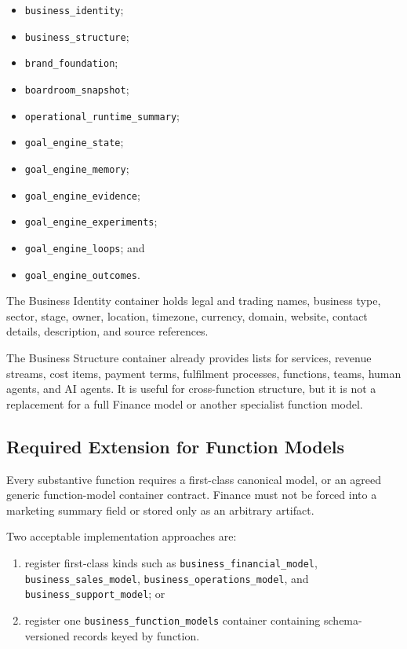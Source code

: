 \begin{itemize}
  \item \texttt{business\_identity};
  \item \texttt{business\_structure};
  \item \texttt{brand\_foundation};
  \item \texttt{boardroom\_snapshot};
  \item \texttt{operational\_runtime\_summary};
  \item \texttt{goal\_engine\_state};
  \item \texttt{goal\_engine\_memory};
  \item \texttt{goal\_engine\_evidence};
  \item \texttt{goal\_engine\_experiments};
  \item \texttt{goal\_engine\_loops}; and
  \item \texttt{goal\_engine\_outcomes}.
\end{itemize}

The Business Identity container holds legal and trading names, business type,
sector, stage, owner, location, timezone, currency, domain, website, contact
details, description, and source references.

The Business Structure container already provides lists for services, revenue
streams, cost items, payment terms, fulfilment processes, functions, teams,
human agents, and AI agents. It is useful for cross-function structure, but it is
not a replacement for a full Finance model or another specialist function model.

\subsection{Required Extension for Function Models}

Every substantive function requires a first-class canonical model, or an agreed
generic function-model container contract. Finance must not be forced into a
marketing summary field or stored only as an arbitrary artifact.

Two acceptable implementation approaches are:

\begin{enumerate}
  \item register first-class kinds such as
  \texttt{business\_financial\_model},
  \texttt{business\_sales\_model},
  \texttt{business\_operations\_model}, and
  \texttt{business\_support\_model}; or
  \item register one \texttt{business\_function\_models} container containing
  schema-versioned records keyed by function.
\end{enumerate}

